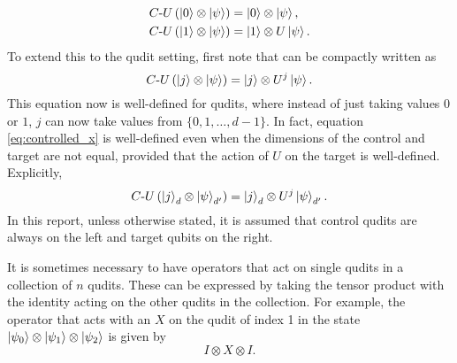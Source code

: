 \begin{align}
    C\text{-}U\left(\ket{0}\otimes\ket{\psi}\right) &= \ket{0}\otimes\ket{\psi},
    \label{eq:controlled_0}\\
    C\text{-}U\left(\ket{1}\otimes\ket{\psi}\right) &= \ket{1}\otimes U\ket{\psi}.
    \label{eq:controlled_1}
\end{align}
To extend this to the qudit setting, first note that  can be compactly written as
\begin{equation}
    C\text{-}U\left(\ket{j}\otimes\ket{\psi}\right) = \ket{j}\otimes U^j\ket{\psi}.
    \label{eq:controlled_x}
\end{equation}
This equation now is well-defined for qudits, where instead of just taking values $0$ or $1$, $j$ can now take values from $\{0, 1, \dots, d-1\}$.
In fact, equation \ref{eq:controlled_x} is well-defined even when the dimensions of the control and target are not equal, provided that the action of $U$ on the target is well-defined.
Explicitly,
\begin{equation}
    C\text{-}U\left(\ket{j}_d\otimes\ket{\psi}_{d'}\right) = \ket{j}_d\otimes U^j\ket{\psi}_{d'}.
\end{equation}
In this report, unless otherwise stated, it is assumed that control qudits are always on the left and target qubits on the right.

It is sometimes necessary to have operators that act on single qudits in a collection of $n$ qudits.
These can be expressed by taking the tensor product with the identity acting on the other qudits in the collection.
For example, the operator that acts with an $X$ on the qudit of index 1 in the state $\ket{\psi_0}\otimes\ket{\psi_1}\otimes\ket{\psi_2}$ is given by
\begin{equation}
    I\otimes X\otimes I.
\end{equation}

